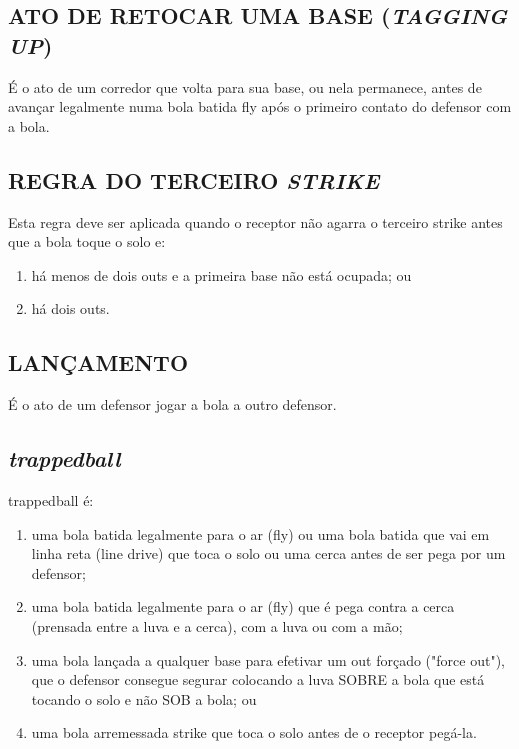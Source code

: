 \subsection{ATO DE RETOCAR UMA BASE (\textit{TAGGING UP})}

É o ato de um corredor que volta para sua base, ou nela permanece, antes de avançar legalmente numa bola batida \gls{fly} após o primeiro contato do defensor  com a bola.

\subsection{REGRA DO TERCEIRO \textit{STRIKE}}

Esta regra deve ser aplicada quando o receptor não agarra o terceiro \gls{strike} antes que a bola toque o solo e:

\begin{enumerate}[label=(\alph*)]\item   há menos de dois \glspl{out} e a primeira base não está ocupada; ou
	\item  há dois \glspl{out}.
\end{enumerate}

\subsection{LANÇAMENTO}

É o ato de um defensor jogar a bola a outro defensor.

\subsection{\textit{trappedball}}
\gls{trappedball} é:

\begin{enumerate}[label=(\alph*)]
	\item   uma bola batida legalmente para o ar (\gls{fly}) ou uma bola batida que vai em linha reta (\gls{line drive}) que toca o solo ou uma cerca antes de ser pega por um defensor;
	\item  uma bola batida legalmente para o ar (\gls{fly}) que é pega contra a cerca (prensada entre a luva e a cerca), com a luva ou com a mão;
	\item  uma bola lançada a qualquer base para efetivar um \gls{out} forçado ("force out"), que o defensor consegue segurar colocando a luva SOBRE a bola que está tocando o solo e não SOB a bola; ou
	\item  uma bola arremessada \gls{strike} que toca o solo antes de o receptor pegá-la.
\end{enumerate}

